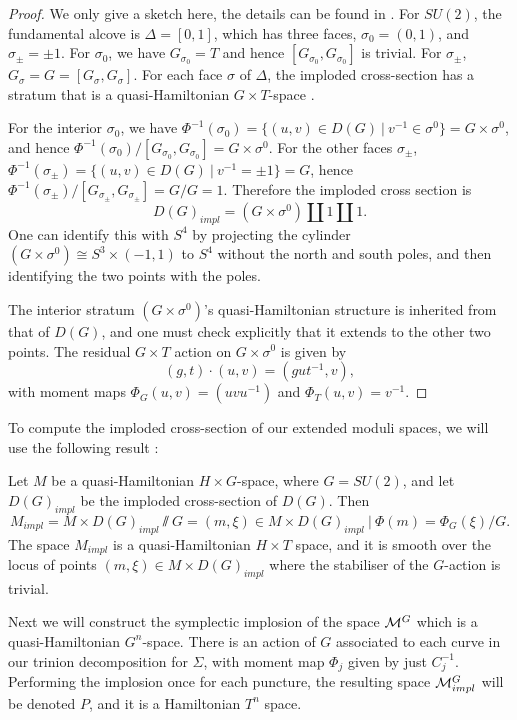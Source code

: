 	\begin{proof}
		We only give a sketch here, the details can be found in \cite[Prop 2.29]{hurtubise_representations_2000}. For $SU(2)$, the fundamental alcove is $\Delta = [0,1]$, which has three faces, $\sigma_0 = (0,1)$, and $\sigma_{\pm} = \pm1$. For $\sigma_0$, we have $G_{\sigma_0} = T$ and hence $[G_{\sigma_0}, G_{\sigma_0}]$ is trivial. For $\sigma_\pm$, $G_\sigma = G = [G_\sigma,G_\sigma]$. For each face $\sigma$ of $\Delta$, the imploded cross-section has a stratum that is a quasi-Hamiltonian $G\times T$-space \cite[Theorem 5.1]{alekseev_lie_1998}.
		
		For the interior $\sigma_0$, we have $\Phi^{-1}(\sigma_0) = \{(u,v)\in D(G)~|~ v^{-1}\in \sigma^0\} = G \times \sigma^0$, and hence $\Phi^{-1}(\sigma_0)/[G_{\sigma_0},G_{\sigma_0}] = G\times \sigma^0$. For the other faces $\sigma_{\pm}$, $\Phi^{-1}(\sigma_\pm) = \{(u,v)\in D(G)~|~ v^{-1} = \pm 1\} = G$, hence $\Phi^{-1}(\sigma_\pm)/[G_{\sigma_\pm},G_{\sigma_\pm}] = G/G = 1$. Therefore the imploded cross section is
		\begin{equation}
			D(G)_{impl} = (G\times \sigma^0) \coprod {1} \coprod {1}.
		\end{equation}
		One can identify this with $S^4$ by projecting the cylinder $(G\times \sigma^0) \cong S^3\times (-1,1)$ to $S^4$ without the north and south poles, and then identifying the two points with the poles. 
		
		The interior stratum $(G\times \sigma^0)$'s quasi-Hamiltonian structure is inherited from that of $D(G)$, and one must check explicitly that it extends to the other two points. The residual $G\times T$ action on $G\times \sigma^0$ is given by
		\begin{equation}
			(g,t)\cdot (u,v) = (gut^{-1},v),
		\end{equation}
		with moment maps $\Phi_G(u,v) = (uvu^{-1})$ and $\Phi_T(u,v) = v^{-1}$.
	\end{proof}
	To compute the imploded cross-section of our extended moduli spaces, we will use the following result \cite[Prop 2.32]{hurtubise_representations_2000}:
	\begin{theorem}
		Let $M$ be a quasi-Hamiltonian $H\times G$-space, where $G=SU(2)$, and let $D(G)_{impl}$ be the imploded cross-section of $D(G)$. Then
		\begin{equation}
			M_{impl} = M\times D(G)_{impl}\sslash G = {(m,\xi)\in M\times D(G)_{impl}~|~\Phi(m)=\Phi_G(\xi)}/G.
		\end{equation}
		The space $M_{impl}$ is a quasi-Hamiltonian $H\times T$ space, and it is smooth over the locus of points $(m,\xi)\in M\times D(G)_{impl}$ where the stabiliser of the $G$-action is trivial.
	\end{theorem}
	Next we will construct the symplectic implosion of the space $\mathcal{M}^G$ which is a quasi-Hamiltonian $G^n$-space. There is an action of $G$ associated to each curve in our trinion decomposition for $\Sigma$, with moment map $\Phi_j$ given by just $C_j^{-1}$. Performing the implosion once for each puncture, the resulting space $\mathcal{M}^G_{impl}$ will be denoted $P$, and it is a Hamiltonian $T^n$ space.
	
